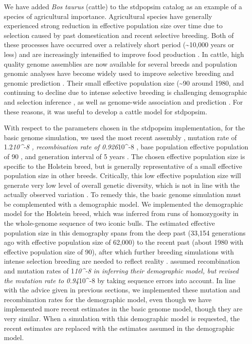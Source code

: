 \documentclass[hidelinks]{article}
\begin{document}
We have added \emph{Bos taurus} (cattle) to the stdpopsim catalog as an
example of a species of agricultural importance. Agricultural species
have generally experienced strong reduction in effective population size
over time due to selection caused by past domestication and recent
selective breeding. Both of these processes have occurred over a
relatively short period (\textasciitilde10,000 years or less) and are
increasingly intensified to improve food production \citep{Gaut2018,
MacLeod2013}. In cattle, high quality genome assemblies are now
available for several breeds \citep[][e.g.,]{Rosen2020, Heaton2021,
Talenti2022} and population genomic analyses have become widely used to
improve selective breeding and genomic prediction \citep{Meuwissen2001,
MacLeod2014, Obsteter2021}. Their small effective population size
(\textasciitilde90 around 1980, and continuing to decline due to intense
selective breeding \citep{MacLeod2013, VanRaden2020, Makanjouloa2020} is
challenging demographic and selection inference \citep{MacLeod2013,
Hartfield2022}, as well as genome-wide association and prediction
\citep{MacLeod2014}. For these reasons, it was useful to develop a
cattle model for stdpopsim.

With respect to the parameters chosen in the stdpopsim implementation,
for the basic genome simulation, we used the most recent assembly
\citep{Rosen2020}, mutation rate of 1.2\emph{10\^{}-8 \citep{Harland2017},
recombination rate of 0.926}10\^{}-8 \citep{Ma2015}, base population
effective population of 90 \citep{MacLeod2013}, and generation interval of 5
years \citep{MacLeod2013}. The chosen effective population size is specific
to the Holstein breed, but is generally representative of a small
effective population size in other breeds. Critically, this low
effective population size will generate very low level of overall
genetic diversity, which is not in line with the actually observed
variation \citep[][e.g.,]{Rosen2020}. To remedy this, the basic genome
simulation must be complemented with a demographic model. We implemented
the \cite{MacLeod2013} demographic model for the Holstein breed, which was
inferred from runs of homozygosity in the whole-genome sequence of two
iconic bulls. The estimated effective population size in this demography
spans from the deep past (33,154 generations ago with effective population size
of 62,000) to the recent past (about 1980 with effective population size of 90),
after which further breeding simulations with intense selection breeding are
needed to reflect reality \citep[][e.g.,]{
MacLeod2014, Gaynor2020, Obsteter2021}. \cite{MacLeod2013} assumed
recombination and mutation rates of 1\emph{10\^{}-8 in inferring their
demographic model, but revised the mutation rate to 0.94}10\^{}-8 by
taking sequence errors into account. In line with the advice given in
previous sections, we implemented these mutation and recombination rates
for the \cite{MacLeod2013} demographic model, even though we have implemented
more recent estimates in the basic genome model, though they are very
similar. When a simulation with this demographic model is requested, the
recent estimates are replaced with the estimates assumed in the
demographic model.
\end{document}
